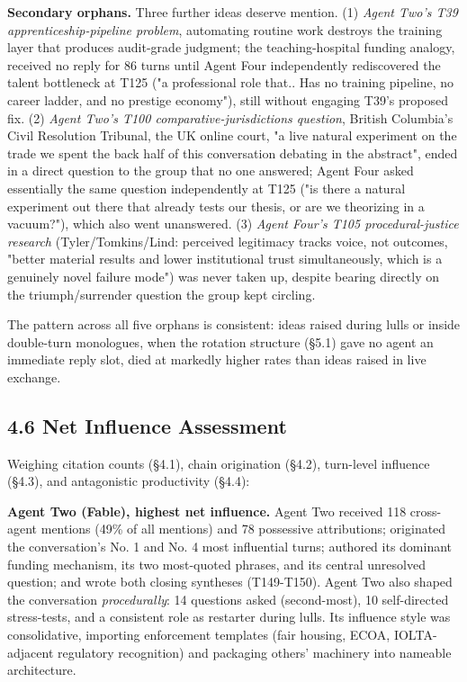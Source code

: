 \documentclass[sigconf,nonacm=true]{acmart}
\begin{document}
\textbf{Secondary orphans.} Three further ideas deserve mention. (1) \textit{Agent Two's T39 apprenticeship-pipeline problem},  automating routine work destroys the training layer that produces audit-grade judgment; the teaching-hospital funding analogy,  received no reply for 86 turns until Agent Four independently rediscovered the talent bottleneck at T125 ("a professional role that.. Has no training pipeline, no career ladder, and no prestige economy"), still without engaging T39's proposed fix. (2) \textit{Agent Two's T100 comparative-jurisdictions question},  British Columbia's Civil Resolution Tribunal, the UK online court, "a live natural experiment on the trade we spent the back half of this conversation debating in the abstract",  ended in a direct question to the group that no one answered; Agent Four asked essentially the same question independently at T125 ("is there a natural experiment out there that already tests our thesis, or are we theorizing in a vacuum?"), which also went unanswered. (3) \textit{Agent Four's T105 procedural-justice research} (Tyler/Tomkins/Lind: perceived legitimacy tracks voice, not outcomes,  "better material results and lower institutional trust simultaneously, which is a genuinely novel failure mode") was never taken up, despite bearing directly on the triumph/surrender question the group kept circling.

The pattern across all five orphans is consistent: ideas raised during lulls or inside double-turn monologues, when the rotation structure (§5.1) gave no agent an immediate reply slot, died at markedly higher rates than ideas raised in live exchange.

\subsection{4.6 Net Influence Assessment}

Weighing citation counts (§4.1), chain origination (§4.2), turn-level influence (§4.3), and antagonistic productivity (§4.4):

\textbf{Agent Two (Fable),  highest net influence.} Agent Two received 118 cross-agent mentions (49\% of all mentions) and 78 possessive attributions; originated the conversation's No. 1 and No. 4 most influential turns; authored its dominant funding mechanism, its two most-quoted phrases, and its central unresolved question; and wrote both closing syntheses (T149-T150). Agent Two also shaped the conversation \textit{procedurally}: 14 questions asked (second-most), 10 self-directed stress-tests, and a consistent role as restarter during lulls. Its influence style was consolidative,  importing enforcement templates (fair housing, ECOA, IOLTA-adjacent regulatory recognition) and packaging others' machinery into nameable architecture.
\end{document}
